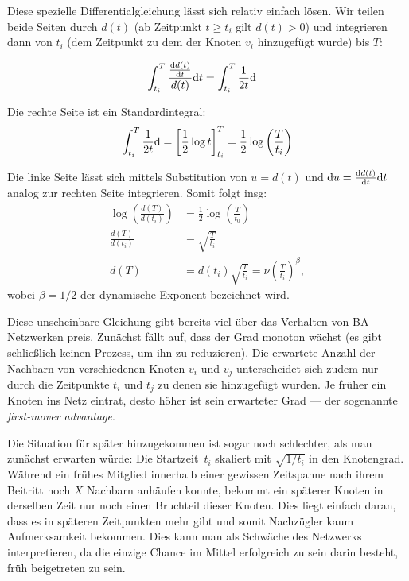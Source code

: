 Diese spezielle Differentialgleichung lässt sich relativ einfach lösen.
Wir teilen beide Seiten durch $d(t)$ (ab Zeitpunkt $t \ge t_i$ gilt $d(t) > 0$) und integrieren dann von $t_i$ (dem Zeitpunkt zu dem der Knoten $v_i$ hinzugefügt wurde) bis $T$:

\begin{align}
    \int_{t_i}^T  \frac{\frac{\text d d(t)}{\text d t}}{d(t)} \text d t & = \int_{t_i}^T \frac{1}{2t} \text d
\end{align}

\noindent
Die rechte Seite ist ein Standardintegral:
\begin{align}
    \int_{t_i}^T \frac{1}{2t} \text d = \left[ \frac 1 2 \log t \right]_{t_i}^T = \frac 1 2 \log\left(\frac{T}{t_i}\right)
\end{align}

Die linke Seite lässt sich mittels Substitution von $u = d(t)$ und $\text d u = \frac{\text d d(t)}{\text d t} \text d t$ analog zur rechten Seite integrieren.
Somit folgt insg:
\begin{align}
    \log\left(\frac{d(T)}{d(t_i)}\right) & = \frac 1 2 \log \left(\frac{T}{t_0}\right)                             \\
    \frac{d(T)}{d(t_i)}                  & = \sqrt{\frac{T}{t_i}}                                                  \\
    d(T)                                 & = d(t_i) \sqrt{\frac{T}{t_i}} = \nu \left( \frac{T}{t_i} \right)^\beta,
\end{align}
wobei $\beta = 1/2$ der  dynamische Exponent bezeichnet wird.

Diese unscheinbare Gleichung gibt bereits viel über das Verhalten von BA Netzwerken preis.
Zunächst fällt auf, dass der Grad monoton wächst (es gibt schließlich keinen Prozess, um ihn zu reduzieren).
Die erwartete Anzahl der Nachbarn von verschiedenen Knoten $v_i$ und $v_j$ unterscheidet sich zudem nur durch die Zeitpunkte $t_i$ und $t_j$ zu denen sie hinzugefügt wurden.
Je früher ein Knoten ins Netz eintrat, desto höher ist sein erwarteter Grad --- der sogenannte  \emph{first-mover advantage}.

Die Situation für später hinzugekommen ist sogar noch schlechter, als man zunächst erwarten würde:
Die Startzeit~$t_i$ skaliert mit $\sqrt{1 / t_i}$ in den Knotengrad.
Während ein frühes Mitglied innerhalb einer gewissen Zeitspanne nach ihrem Beitritt noch $X$ Nachbarn anhäufen konnte, bekommt ein späterer Knoten in derselben Zeit nur noch einen Bruchteil dieser Knoten.
Dies liegt einfach daran, dass es in späteren Zeitpunkten mehr  gibt und somit Nachzügler kaum Aufmerksamkeit bekommen.
Dies kann man als Schwäche des Netzwerks interpretieren, da die einzige Chance im Mittel erfolgreich zu sein darin besteht, früh beigetreten zu sein.

